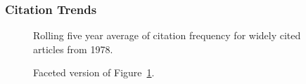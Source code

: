 \documentclass[
  10pt,
  letterpaper,
  DIV=11,
  numbers=noendperiod,
  twoside]{scrartcl}
\begin{document}
\subsubsection*{Citation Trends}\label{sec-trends-1978}

\begin{figure}


\caption{\label{fig-citation-spaghetti-1978}Rolling five year average of
citation frequency for widely cited articles from 1978.}

\end{figure}%

\begin{figure}


\caption{\label{fig-citation-facet-1978}Faceted version of
Figure~\ref{fig-citation-spaghetti-1978}.}

\end{figure}%
\end{document}
